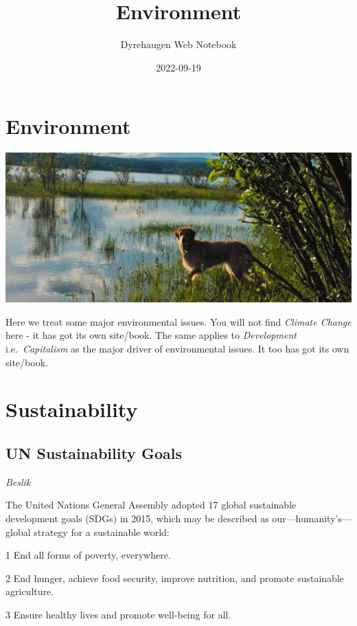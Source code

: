 \documentclass[
]{book}
\title{Environment}
\author{Dyrehaugen Web Notebook}
\date{2022-09-19}
\begin{document}
\maketitle

{
\setcounter{tocdepth}{1}
\tableofcontents
}
\hypertarget{environment}{%
\chapter{Environment}\label{environment}}

\includegraphics{fig/zelda.jpg}

Here we treat some major environmental issues.
You will not find \emph{Climate Change} here - it has got its own site/book.
The same applies to \emph{Development} i.e.~\emph{Capitalism} as the major
driver of environmental issues.
It too has got its own site/book.

\hypertarget{sustainability}{%
\chapter{Sustainability}\label{sustainability}}

\hypertarget{un-sustainability-goals}{%
\section{UN Sustainability Goals}\label{un-sustainability-goals}}

\emph{Beslik}

The United Nations General Assembly adopted 17 global sustainable development goals (SDGs) in 2015, which may be described as our---humanity's---global strategy for a sustainable world:

1 End all forms of poverty, everywhere.

2 End hunger, achieve food security, improve nutrition, and promote sustainable agriculture.

3 Ensure healthy lives and promote well-being for all.
\end{document}
